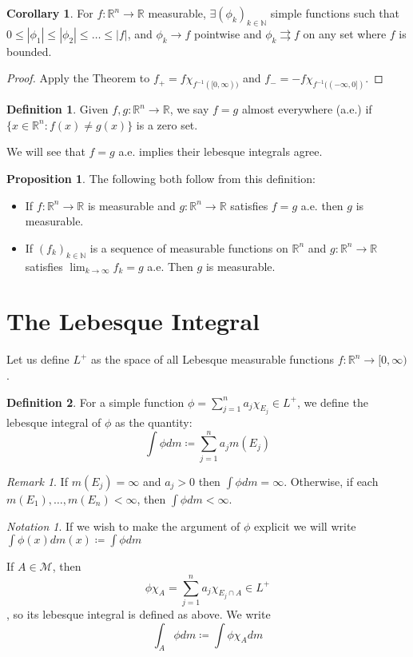 \documentclass{article}
\theoremstyle{definition}
\newtheorem{definition}{Definition}[section]
\newtheorem{prop}{Proposition}[section]
\newtheorem{corollary}{Corollary}[theorem]
\theoremstyle{remark}
\newtheorem*{remark}{Remark}
\theoremstyle{remark}
\newtheorem*{notation}{Notation}
\def\reals{{\mathbb R}}
\def\scriptm{{\mathcal M}}
\def\naturals{{\mathbb N}}
\begin{document}
\begin{corollary}
For $f: \reals^n \to \reals$ measurable, $\exists (\phi_k)_{k\in\naturals}$ simple functions such that $0 \leq |\phi_1| \leq |\phi_2| \leq \dots \leq |f|$, and $\phi_k \to f$ pointwise and $\phi_k \rightrightarrows f$ on any set where $f$ is bounded.  
\end{corollary}
\begin{proof}
Apply the Theorem to $f_{+} = f\chi_{f^{-1}([0, \infty))}$ and $f_{-} = - f\chi_{f^{-1}((-\infty, 0])}$. 
\end{proof}
\begin{definition}
Given $f, g: \reals^n \to \reals$, we say $f=g$ almost everywhere (a.e.) if $\{x\in \reals^n : f(x) \neq g(x)\}$ is a zero set.
\end{definition}
We will see that $f=g$ a.e. implies their lebesque integrals agree.
\begin{prop} The following both follow from this definition:
\begin{itemize}
	\item If $f: \reals^n \to \reals$ is measurable and $g: \reals^n \to \reals$ satisfies $f = g$ a.e. then $g$ is measurable. 
	\item If $(f_k)_{k\in\naturals}$ is a sequence of measurable functions on $\reals^n$ and $g: \reals^n \to \reals$ satisfies $\lim_{k\to\infty} f_k = g$ a.e. Then $g$ is measurable.
\end{itemize}
\end{prop}

\section{The Lebesque Integral}
Let us define $L^{+}$ as the space of all Lebesque measurable functions $f: \reals^{n} \to [0, \infty)$.
\begin{definition}
	For a simple function $\phi = \sum_{j=1}^{n} a_j \chi_{E_j} \in L^{+}$, we define the lebesque integral of $\phi$ as the quantity: 
	$$\int \phi dm \coloneqq \sum_{j=1}^n a_j m(E_j)$$
\end{definition}
\begin{remark} 
If $m(E_j) = \infty$ and $a_j > 0$ then $\int \phi dm = \infty$. Otherwise, if each $m(E_1), \dots, m(E_n) < \infty$, then $\int \phi dm < \infty$.
\end{remark}

\begin{notation}
If we wish to make the argument of $\phi$ explicit we will write $\int \phi(x) dm(x) \coloneqq \int \phi dm$

If $A \in \scriptm$, then
$$\phi \chi_A = \sum_{j =1}^n a_j \chi_{E_j \cap A} \in L^{+}$$,
so its lebesque integral is defined as above. We write 
$$\int_A \phi dm \coloneqq \int \phi \chi_A dm$$
\end{notation}
\end{document}

